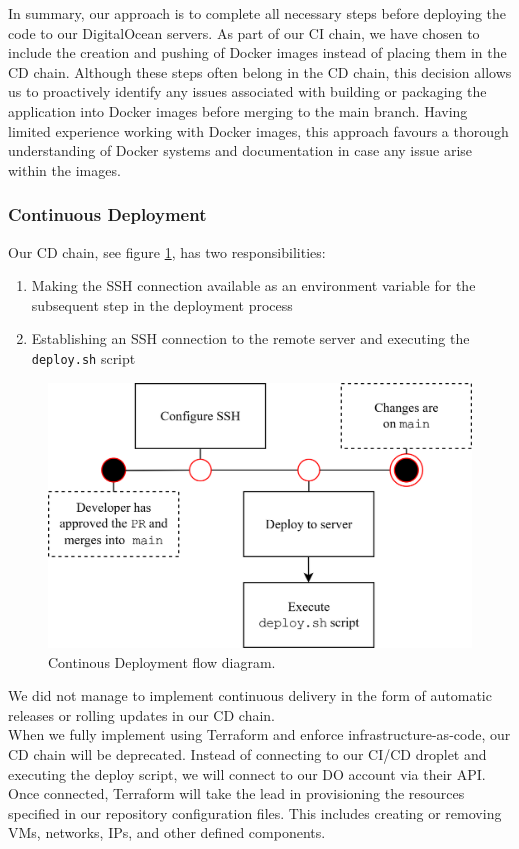In summary, our approach is to complete all necessary steps before deploying the code to our DigitalOcean servers. As part of our CI chain, we have chosen to include the creation and pushing of Docker images instead of placing them in the CD chain. Although these steps often belong in the CD chain, this decision allows us to proactively identify any issues associated with building or packaging the application into Docker images before merging to the main branch. Having limited experience working with Docker images, this approach favours a thorough understanding of Docker systems and documentation in case any issue arise within the images.

\subsubsection{Continuous Deployment}

\noindent Our CD chain, see figure \ref{fig:cd}, has two responsibilities: 

\begin{enumerate}
    \item Making the SSH connection available as an environment variable for the subsequent step in the deployment process
    \item Establishing an SSH connection to the remote server and executing the \texttt{deploy.sh} script
\end{enumerate}

\begin{figure}[H]
    \centering
    \includegraphics[width=.35\linewidth]{images/cd-flow.png} 
    \caption{Continous Deployment flow diagram.}
    \label{fig:cd}
\end{figure}

We did not manage to implement continuous delivery in the form of automatic releases or rolling updates in our CD chain.\\

When we fully implement using Terraform and enforce infrastructure-as-code, our CD chain will be deprecated. Instead of connecting to our CI/CD droplet and executing the deploy script, we will connect to our DO account via their API. Once connected, Terraform will take the lead in provisioning the resources specified in our repository configuration files. This includes creating or removing VMs, networks, IPs, and other defined components.

